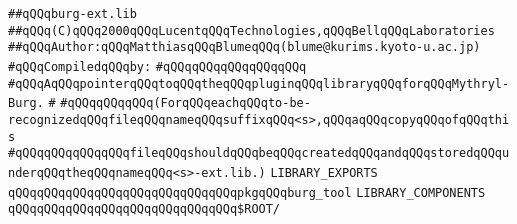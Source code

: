 \label{src/app/makelib/tools/mlburg/burg-ext.lib}
\verb|##qQQqburg-ext.lib|\newline
\verb|##qQQq(C)qQQq2000qQQqLucentqQQqTechnologies,qQQqBellqQQqLaboratories|\newline
\verb|##qQQqAuthor:qQQqMatthiasqQQqBlumeqQQq(blume@kurims.kyoto-u.ac.jp)|\newline
\newline
\verb|#qQQqCompiledqQQqby:|\newline
\verb|#qQQqqQQqqQQqqQQqqQQq|\newline
\newline
\newline
\newline
\verb|#qQQqAqQQqpointerqQQqtoqQQqtheqQQqpluginqQQqlibraryqQQqforqQQqMythryl-Burg.|\newline
\verb|#|\newline
\verb|#qQQqqQQqqQQq(ForqQQqeachqQQqto-be-recognizedqQQqfileqQQqnameqQQqsuffixqQQq<s>,qQQqaqQQqcopyqQQqofqQQqthis|\newline
\verb|#qQQqqQQqqQQqqQQqfileqQQqshouldqQQqbeqQQqcreatedqQQqandqQQqstoredqQQqunderqQQqtheqQQqnameqQQq<s>-ext.lib.)|\newline
\newline
\newline
\newline
\verb|LIBRARY_EXPORTS|\newline
\newline
\verb|qQQqqQQqqQQqqQQqqQQqqQQqqQQqqQQqpkgqQQqburg_tool|\newline
\newline
\newline
\newline
\verb|LIBRARY_COMPONENTS|\newline
\newline
\verb|qQQqqQQqqQQqqQQqqQQqqQQqqQQqqQQq$ROOT/|\newline

